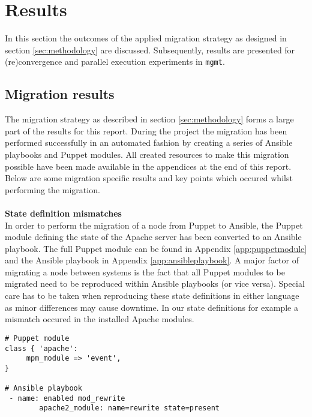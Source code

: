 \section{Results}\label{sec:results}
In this section the outcomes of the applied migration strategy as designed in section \ref{sec:methodology} are discussed. Subsequently, results are presented for (re)convergence and parallel execution experiments in \texttt{mgmt}.

\subsection{Migration results}
The migration strategy as described in section \ref{sec:methodology} forms a large part of the results for this report. During the project the migration has been performed successfully in an automated fashion by creating a series of Ansible playbooks and Puppet modules. All created resources to make this migration possible have been made available in the appendices at the end of this report. Below are some migration specific results and key points which occured whilst performing the migration. 
\\\\
\noindent
\textbf{State definition mismatches}\\
In order to perform the migration of a node from Puppet to Ansible, the Puppet module defining the state of the Apache server has been converted to an Ansible playbook. The full Puppet module can be found in Appendix \ref{app:puppetmodule} and the Ansible playbook in Appendix \ref{app:ansibleplaybook}. A major factor of migrating a node between systems is the fact that all Puppet modules to be migrated need to be reproduced within Ansible playbooks (or vice versa). Special care has to be taken when reproducing these state definitions in either language as minor differences may cause downtime. In our state definitions for example a mismatch occured in the installed Apache modules.
\\
\begin{lstlisting}[caption={Module mismatch in state definitions},label=puppetmod]
# Puppet module
class { 'apache':
     mpm_module => 'event',
}

# Ansible playbook
 - name: enabled mod_rewrite
        apache2_module: name=rewrite state=present
\end{lstlisting}

